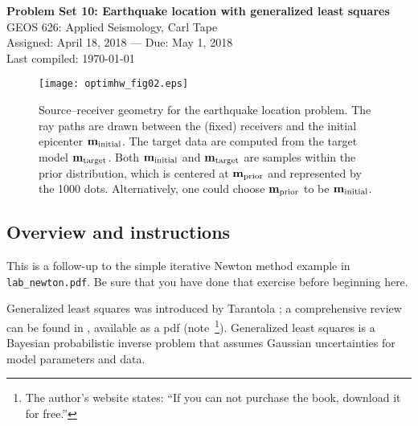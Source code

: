 \documentclass[11pt,titlepage,fleqn]{article}
\begin{document}

\begin{spacing}{1.2}
\centering
{\large \bf Problem Set 10: Earthquake location with generalized least squares} \\
GEOS 626: Applied Seismology, Carl Tape \\
Assigned: April 18, 2018 --- Due: May 1, 2018 \\
Last compiled: \today
\end{spacing}


\vspace{1cm}
\begin{figure}[h]
\centering
\texttt{[image: optimhw\_fig02.eps]}
\caption[Source-receiver geometry]
{{
Source--receiver geometry for the earthquake location problem. The ray paths are drawn between the (fixed) receivers and the initial epicenter $\mbox{${\bf m}$}_{\rm initial}$. The target data are computed from the target model $\mbox{${\bf m}$}_{\rm target}$. Both $\mbox{${\bf m}$}_{\rm initial}$ and $\mbox{${\bf m}$}_{\rm target}$ are samples within the prior distribution, which is centered at $\mbox{${\bf m}$}_{\rm prior}$ and represented by the 1000 dots. Alternatively, one could choose $\mbox{${\bf m}$}_{\rm prior}$ to be $\mbox{${\bf m}$}_{\rm initial}$.
\label{fig:srcrec}
}}
\end{figure}


\pagebreak
\subsection*{Overview and instructions}

This is a follow-up to the simple iterative Newton method example in \verb+lab_newton.pdf+. Be sure that you have done that exercise before beginning here.

Generalized least squares was introduced by Tarantola \citep{TarantolaValette1982quest,TarantolaValette1982nonlinear}; a comprehensive review can be found in \citet{Tarantola2005}, available as a pdf (note~\footnote{The author's website states: ``If you can not purchase the book, download it for free.''}). Generalized least squares is a Bayesian probabilistic inverse problem that assumes Gaussian uncertainties for model parameters and data.
\end{document}
